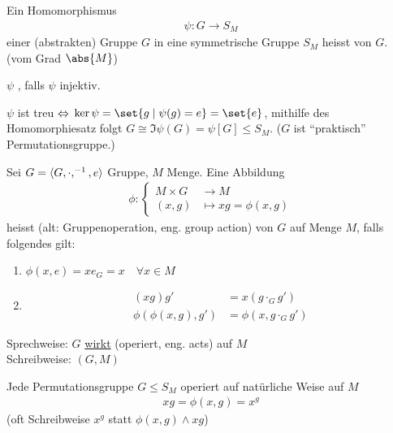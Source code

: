 \begin{definition}[Permutationsdarstellung]
	\label{sec2:def:permudarstellung}
	\begin{defenum}
		\item Ein Homomorphismus
		\begin{align*}
			\psi\colon G \to S_M
		\end{align*}
		einer (abstrakten) Gruppe $G$ in eine symmetrische Gruppe $S_M$ heisst  von $G$. (vom Grad $\abs{M}$)
		\item $\psi$ , falls $\psi$ injektiv.
	\end{defenum}
\end{definition}
\begin{*remark}
	$\psi$ ist treu $\Leftrightarrow$ $\ker \psi = \set{g \mid \psi(g) = e} = \set{e}$, mithilfe des Homomorphiesatz folgt $G \cong \Im \psi(G) = \psi[G] \le S_M$. ($G$ ist ``praktisch'' Permutationsgruppe.)
\end{*remark}
\begin{definition}
	Sei $G = \langle G, \cdot, ^{-1}, e \rangle$ Gruppe, $M$ Menge. Eine Abbildung
	\begin{align*}
		\phi \colon \begin{cases}
			M \times G &\to M\\
			(x,g) &\mapsto xg = \phi(x,g)
		\end{cases}
	\end{align*}
	heisst (alt: Gruppenoperation, eng. group action) von $G$ auf Menge $M$, falls folgendes gilt:
	\begin{enumerate}
		\item $\phi(x,e) =xe_G = x \quad \forall x \in M$
		\item 
		\begin{align*}
			(xg)g' &= x(g\cdot_G g')\\
			\phi(\phi(x,g),g') &= \phi(x,g\cdot_G g')
		\end{align*}
	\end{enumerate}
	Sprechweise: $G$ \ul{wirkt} (operiert, eng. acts) auf $M$\\
	Schreibweise: $(G,M)$
\end{definition}
\begin{*remark}
	Jede Permutationsgruppe $G \le S_M$ operiert auf natürliche Weise auf $M$
	\begin{align*}
		xg = \phi(x,g) = x^g
	\end{align*}
	(oft Schreibweise $x^g$ statt $\phi(x,g) \wedge xg$)
\end{*remark}
